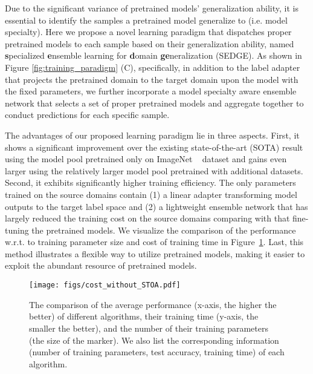 \documentclass{article}
\begin{document}
Due to the significant variance of pretrained models' generalization ability, it is essential to identify the samples a pretrained model generalize to (i.e. model specialty). 
Here we propose a novel learning paradigm that dispatches proper pretrained models to each sample based on their generalization ability, named {\bf s}pecialized {\bf e}nsemble learning for {\bf d}omain {\bf ge}neralization (SEDGE). 
As shown in Figure \ref{fig:training_paradigm} (C), specifically, in addition to the label adapter that projects the pretrained domain to the target domain upon the  model with the fixed parameters, we further
incorporate a model specialty aware ensemble network
that selects a set of proper pretrained models 
and aggregate together to conduct predictions for each specific sample. 


The advantages of our proposed learning paradigm lie in three aspects.
First, it shows a significant improvement
over the existing state-of-the-art (SOTA) result using the model pool pretrained only on ImageNet ~\citep{krizhevsky2012imagenet} dataset and 
gains even larger using the relatively larger model pool pretrained with additional datasets.
Second, it exhibits significantly higher training efficiency. The only parameters trained on the source domains contain (1) a linear adapter transforming model outputs to the target label space and (2) a lightweight ensemble network that has largely reduced the training cost on the source domains comparing with that fine-tuning the pretrained models.
We visualize the comparison of the performance w.r.t. to training parameter size and cost of training time in Figure~\ref{fig:cost-comparison}.
Last, this method illustrates a flexible way to utilize pretrained models, making it easier to exploit the abundant resource of pretrained models.

\begin{figure}
    \begin{center}

    \texttt{[image: figs/cost\_without\_STOA.pdf]}
  \end{center}

  \caption{The comparison of the average performance (x-axis, the higher the better) of different algorithms, their training time (y-axis, the smaller the better), and the number of their training parameters (the size of the marker). We also list the corresponding information (number of training parameters, test accuracy, training time) of each algorithm.
}
  

  \label{fig:cost-comparison}
\end{figure}
\end{document}
